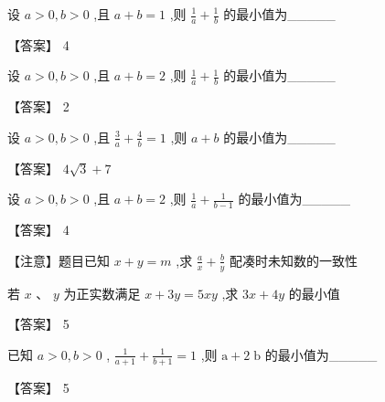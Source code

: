 \documentclass[11pt,a4paper]{article}
\begin{document}
\begin{problem} 
设 \(\displaystyle a > 0,b > 0\) ,且 \(\displaystyle a + b = 1\) ,则 \(\displaystyle \frac{1}{a} + \frac{1}{b}\) 的最小值为\_\_\_\_\_
\begin{jiexi}
【答案】 4


\end{jiexi}
\end{problem}
\begin{problem} 
设 \(\displaystyle a > 0,b > 0\) ,且 \(\displaystyle a + b = 2\) ,则 \(\displaystyle \frac{1}{a} + \frac{1}{b}\) 的最小值为\_\_\_\_\_
\begin{jiexi}
【答案】 2


\end{jiexi}
\end{problem}
\begin{problem} 
设 \(\displaystyle a > 0,b > 0\) ,且 \(\displaystyle \frac{3}{a} + \frac{4}{b} = 1\) ,则 \(\displaystyle a + b\) 的最小值为\_\_\_\_\_
\begin{jiexi}
【答案】 \(\displaystyle 4\sqrt{3} + 7\)


\end{jiexi}
\end{problem}
\begin{problem} 
设 \(\displaystyle a > 0,b > 0\) ,且 \(\displaystyle a + b = 2\) ,则 \(\displaystyle \frac{1}{a} + \frac{1}{b - 1}\) 的最小值为\_\_\_\_\_
\begin{jiexi}
【答案】 4

【注意】题目已知 \(\displaystyle x + y = m\) ,求 \(\displaystyle \frac{a}{x} + \frac{b}{y}\) 配凑时未知数的一致性


\end{jiexi}
\end{problem}
\begin{problem} 
若 \(\displaystyle x\) 、 \(\displaystyle y\) 为正实数满足 \(\displaystyle x + {3y} = {5xy}\) ,求 \(\displaystyle {3x} + {4y}\) 的最小值
\begin{jiexi}[25]
【答案】 5


\end{jiexi}
\end{problem}
\begin{problem} 
已知 \(\displaystyle a > 0,b > 0\) , \(\displaystyle \frac{1}{a + 1} + \frac{1}{b + 1} = 1\) ,则 \(\displaystyle \mathrm{a} + 2\mathrm{\;b}\) 的最小值为\_\_\_\_\_
\begin{jiexi}
【答案】 5


\end{jiexi}
\end{problem}
\end{document}
